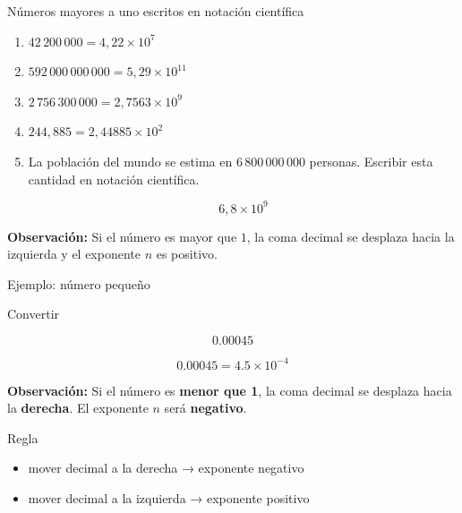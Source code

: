 \documentclass[aspectratio=169,10pt,handout]{beamer}
\newcommand{\pp}{\pause}
\begin{document}
		\begin{frame}{Números mayores a uno escritos en notación científica}
				
				\begin{enumerate}
					
					\item $42\,200\,000 = 4,22 \times 10^{7}$
					
					\item $592\,000\,000\,000 = 5,29 \times 10^{11}$
					
					\item $2\,756\,300\,000 = 2,7563 \times 10^{9}$
					
					\item $244,885 = 2,44885 \times 10^{2}$
					
					\item La población del mundo se estima en $6\,800\,000\,000$ personas.  
					Escribir esta cantidad en notación científica.
					
					\[
					6,8 \times 10^{9}
					\]
					
				\end{enumerate}
				
				\vspace{0.3cm}
				
				\textbf{Observación:} 
				Si el número es mayor que $1$, la coma decimal se desplaza hacia la izquierda y el exponente $n$ es positivo.
							
		\end{frame}
		
	\begin{frame}{Ejemplo: número pequeño}
		
		Convertir
		
		\[
		0.00045
		\]
		
		\pp
		
		\[
		0.00045 = 4.5 \times 10^{-4}
		\]
		
		\pp
			\textbf{Observación:} 
		Si el número es \textbf{menor que 1}, la coma decimal se desplaza hacia la \textbf{derecha}. El exponente \(n\) será \textbf{negativo}.
		
		\begin{block}{Regla}
			
			\begin{itemize}
				
				\item mover decimal a la derecha → exponente negativo
				
				\item mover decimal a la izquierda → exponente positivo
				
			\end{itemize}
			
		\end{block}
		
	\end{frame}
	
\end{document}
